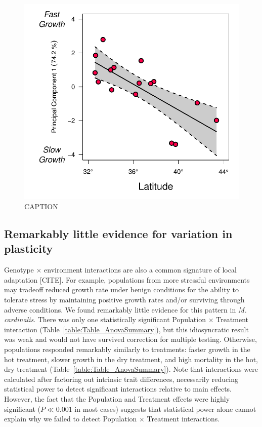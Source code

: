 \documentclass[11pt, oneside]{article}\usepackage[]{graphicx}\usepackage[]{color}
\begin{document}
\begin{figure}[h!]
	\centerline{\includegraphics[width=1\textwidth]{Figures/Figure_PC1vLat.pdf}}
	\fontsize{10}{12}
	\selectfont
	\caption[Southern populations grow faster]{CAPTION}
	\label{fig:Fig_PC1vLat}
\end{figure}

\subsection*{Remarkably little evidence for variation in plasticity}

Genotype $\times$ environment interactions are also a common signature of local adaptation [CITE]. For example, populations from more stressful environments may tradeoff reduced growth rate under benign conditions for the ability to tolerate stress by maintaining positive growth rates and/or surviving through adverse conditions. We found remarkably little evidence for this pattern in \textit{M. cardinalis}. There was only one statistically significant Population $\times$ Treatment interaction (Table~\ref{table:Table_AnovaSummary}), but this idiosyncratic result was weak and would not have survived correction for multiple testing. Otherwise, populations responded remarkably similarly to treatments: faster growth in the hot treatment, slower growth in the dry treatment, and high mortality in the hot, dry treatment (Table~\ref{table:Table_AnovaSummary}). Note that interactions were calculated after factoring out intrinsic trait differences, necessarily reducing statistical power to detect significant interactions relative to main effects. However, the fact that the Population and Treatment effects were highly significant ($P \ll 0.001$ in most cases) suggests that statistical power alone cannot explain why we failed to detect Population $\times$ Treatment interactions.
\end{document}
